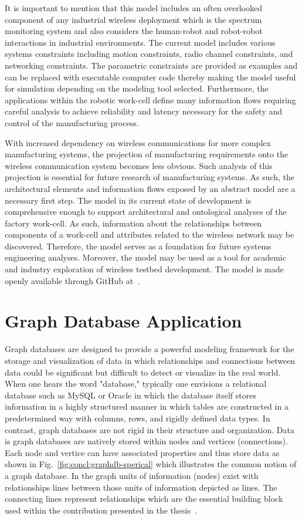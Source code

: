 It is important to mention that this model includes an often overlooked component of any industrial wireless deployment which is the spectrum monitoring system and also considers the human-robot and robot-robot interactions in industrial environments. The current model includes various systems constraints including motion constraints, radio channel constraints, and networking constraints. The parametric constraints are provided as examples and can be replaced with executable computer code thereby making the model useful for simulation depending on the modeling tool selected. Furthermore, the applications within the robotic work-cell define many information flows requiring careful analysis to achieve reliability and latency necessary for the safety and control of the manufacturing process.

With increased dependency on wireless communications for more complex manufacturing systems, the projection of manufacturing requirements onto the wireless communication system becomes less obvious. Such analysis of this projection is essential for future research of manufacturing systems. As such, the architectural elements and information flows exposed by an abstract model
are a necessary first step. The model in its current state of development is comprehensive enough to support architectural and ontological analyses of the factory work-cell.  As such, information about the relationships between components of a work-cell and attributes related to the wireless network may be discovered. Therefore, the model serves as a foundation for future systems engineering analyses. Moreover, the model may be used as a tool for academic and industry exploration of wireless testbed development.  The model is made openly available through GitHub at~\cite{SysML.Candell2018}.

\section{Graph Database Application}

Graph databases are designed to provide a powerful modeling framework for the storage and visualization of data in which relationships and connections between data could be significant but difficult to detect or visualize in the real world.  When one hears the word "database," typically one envisions a relational database such as MySQL or Oracle in which the database itself stores information in a highly structured manner in which tables are constructed in a predetermined way with columns, rows, and rigidly defined data types.  In contrast, graph databases are not rigid in their structure and organization.  Data is graph databases are natively stored within nodes and vertices (connections).  Each node and vertice can have associated properties and thus store data as shown in Fig.~\ref{fig:concl:graphdb-sperical} which illustrates the common notion of a graph database.  In the graph units of information (nodes) exist with relationships lines between those units of information depicted as lines.  The connecting lines represent relationships which are the essential building block used within the contribution presented in the thesis~\cite{CandellISIT2020.Conf}.  

